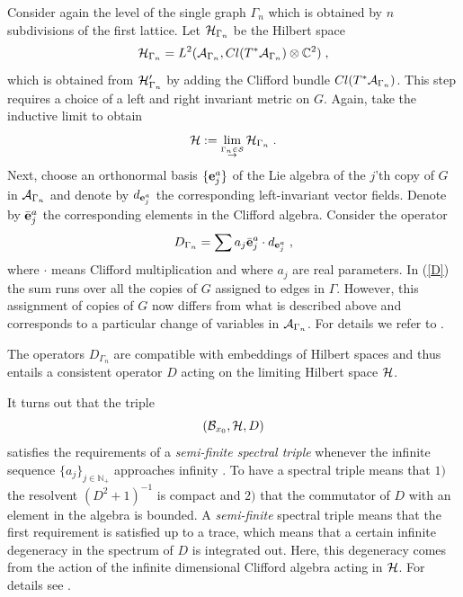 \documentclass[12pt]{article}
\def\G{\Gamma}
\def\ca{{\cal A}}
\def\cb{{\cal B}}
\def\ch{{\cal H}}
\def\cs{{\cal S}}
\begin{document}
Consider again the level of the single graph $\G_n$ which is obtained by $n$ subdivisions of the first lattice. Let $\ch_{\G_n}$ be the Hilbert space 
\begin{equation}
\ch_{\G_n}=L^2(\ca_{\G_n},Cl(T^*\ca_{\G_n})\otimes\mathbb{C}^2)\;,
\label{HI}
\end{equation}
which is obtained from $\ch_{\G_n}'$ by adding the Clifford bundle $Cl(T^*\ca_{\G_n})$.
This step requires a choice of a left and right invariant metric on $G$. Again, take the inductive limit to obtain
$$
\ch := \lim_{\stackrel{\G_n\in\cs}{\rightarrow}}\ch_{\G_n}\;.
$$
 Next, choose an orthonormal basis $\{{\bf e}_j^a\}$ of the Lie algebra of the $j$'th copy of $G$ in $\ca_{\G_n}$ and denote by
$ d_{{\bf e}_j^a}$ the corresponding left-invariant vector fields. Denote by $\bar{\bf e}_j^a$ the corresponding elements in the Clifford algebra. Consider the operator
\begin{equation}
D_{\G_n} = \sum a_j \bar{\bf e}_j^a\cdot d_{{\bf e}_j^a}\;,
\label{D}
\end{equation}
where $\cdot$ means Clifford multiplication and where $a_j$ are real parameters. In (\ref{D}) the sum runs over all the copies of $G$ assigned to edges in $\G$. However, this assignment of copies of $G$ now differs from what is described above and corresponds to a particular change of variables in $\ca_{\G_n}$.  For details we refer to  \cite{AGN3}. 

The operators $D_{\G_n}$ are compatible with embeddings of Hilbert spaces and thus entails a consistent operator $D$ acting on the limiting Hilbert space $\ch$. 

It turns out that the triple 
\begin{equation}
(\cb_{x_0},\ch,D)
\label{spec}
\end{equation} 
satisfies the requirements of a {\it semi-finite spectral triple } whenever the infinite sequence $\{a_j\}_{j\in\mathbb{N}_+}$ approaches infinity \cite{AGN3}. To have a spectral triple means that $1)$ the resolvent $(D^2+1)^{-1}$ is compact and $2)$ that the commutator of $D$ with an element in the algebra is bounded. A {\it semi-finite} spectral triple means that the first requirement is satisfied up to a trace, which means that a certain infinite degeneracy in the spectrum of $D$ is integrated out. Here, this degeneracy comes from the action of the infinite dimensional Clifford algebra acting in $\ch$. For details see \cite{AGN2,AGN3} .
\end{document}
